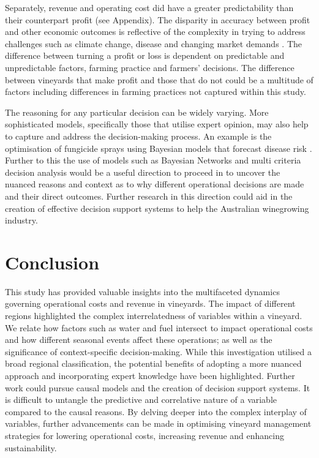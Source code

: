 \documentclass[review,12pt,authoryear]{elsarticle}
\begin{document}
\begin{linenumbers}
\par
Separately, revenue and operating cost did have a greater predictability than their counterpart profit (see Appendix). The disparity in accuracy between profit and other economic outcomes is reflective of the complexity in trying to address challenges such as climate change, disease and changing market demands \citep{wineaustraliaNationalVintageReport2020,wineaustraliaNationalVintageReport2021,wineaustraliaNationalVintageReport2022}. The difference between turning a profit or loss is dependent on predictable and unpredictable factors, farming practice and farmers' decisions. The difference between vineyards that make profit and those that do not could be a multitude of factors including differences in farming practices not captured within this study.
\par
The reasoning for any particular decision can be widely varying. More sophisticated models, specifically those that utilise expert opinion, may also help to capture and address the decision-making process. An example is the optimisation of fungicide sprays using Bayesian models that forecast disease risk \citep{luDiseaseRiskForecasting2020}. Further to this the use of models such as Bayesian Networks and multi criteria decision analysis would be a useful direction to proceed in to uncover the nuanced reasons and context as to why different operational decisions are made and their direct outcomes. Further research in this direction could aid in the creation of effective decision support systems to help the Australian winegrowing industry.

\section{Conclusion}

This study has provided valuable insights into the multifaceted dynamics governing operational costs and revenue in vineyards. The impact of different regions highlighted the complex interrelatedness of variables within a vineyard. We relate how factors such as water and fuel intersect to impact operational costs and how different seasonal events affect these operations; as well as the significance of context-specific decision-making. While this investigation utilised a broad regional classification, the potential benefits of adopting a more nuanced approach and incorporating expert knowledge have been highlighted. Further work could pursue causal models and the creation of decision support systems. It is difficult to untangle the predictive and correlative nature of a variable compared to the causal reasons. By delving deeper into the complex interplay of variables, further advancements can be made in optimising vineyard management strategies for lowering operational costs, increasing revenue and enhancing sustainability.


\end{linenumbers}
\end{document}

